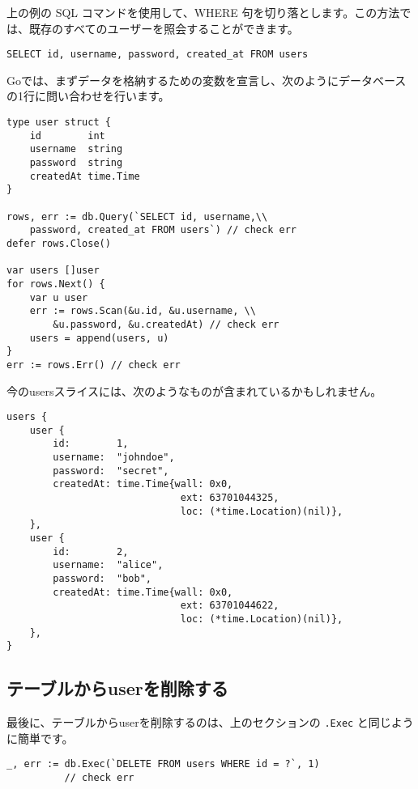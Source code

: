 上の例の SQL コマンドを使用して、WHERE 句を切り落とします。この方法では、既存のすべてのユーザーを照会することができます。

\begin{lstlisting}[numbers=none]
SELECT id, username, password, created_at FROM users
\end{lstlisting}

Goでは、まずデータを格納するための変数を宣言し、次のようにデータベースの1行に問い合わせを行います。

\begin{lstlisting}[numbers=none]
type user struct {
    id        int
    username  string
    password  string
    createdAt time.Time
}

rows, err := db.Query(`SELECT id, username,\\
    password, created_at FROM users`) // check err
defer rows.Close()

var users []user
for rows.Next() {
    var u user
    err := rows.Scan(&u.id, &u.username, \\
        &u.password, &u.createdAt) // check err
    users = append(users, u)
}
err := rows.Err() // check err
\end{lstlisting}

今のusersスライスには、次のようなものが含まれているかもしれません。

\begin{lstlisting}[numbers=none]
users {
    user {
        id:        1,
        username:  "johndoe",
        password:  "secret",
        createdAt: time.Time{wall: 0x0,
                              ext: 63701044325,
                              loc: (*time.Location)(nil)},
    },
    user {
        id:        2,
        username:  "alice",
        password:  "bob",
        createdAt: time.Time{wall: 0x0,
                              ext: 63701044622,
                              loc: (*time.Location)(nil)},
    },
}
\end{lstlisting}

\subsection{テーブルからuserを削除する}

最後に、テーブルからuserを削除するのは、上のセクションの \texttt{.Exec} と同じように簡単です。


\begin{lstlisting}[numbers=none]
_, err := db.Exec(`DELETE FROM users WHERE id = ?`, 1)
          // check err
\end{lstlisting}







